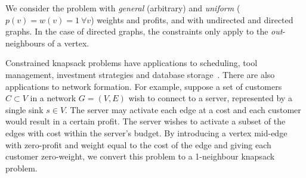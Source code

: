 \documentclass[12pt]{article}
\begin{document}
We consider the problem with {\em general}
(arbitrary) and {\em uniform} ($p(v) = w(v) = 1\ \forall v$) weights
and profits, and with undirected and directed graphs.  In the case of
directed graphs, the constraints only apply to the {\em out}-neighbours of a vertex.

Constrained knapsack problems have applications to scheduling, tool
management, investment strategies and database
storage~\cite{KPP,BFFS05,Johnson:1983p1256}.  There are also
applications to network formation.  For example, suppose a set of
customers $C \subset V$ in a network $G = (V,E)$ wish to connect to a
server, represented by a single sink $s \in V$.  The server may
activate each edge at a cost and each customer would result in a
certain profit.  The server wishes to activate a subset of the edges
with cost within the server's budget. By introducing a vertex mid-edge
with zero-profit and weight equal to the cost of the edge and giving
each customer zero-weight, we convert this problem to a 1-neighbour
knapsack problem.
\end{document}
